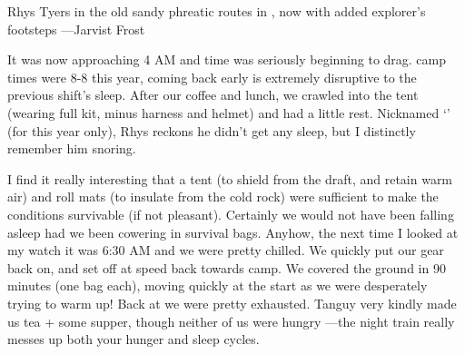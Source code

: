 \begin{marginfigure}
\checkoddpage \ifoddpage \forcerectofloat \else \forceversofloat \fi
\centering
 \caption{Rhys Tyers in the old sandy phreatic routes in , now with added explorer's footsteps ---Jarvist Frost}
 \label{potato formations}
\end{marginfigure}

It was now approaching 4 AM and time was seriously beginning to drag.  camp times were 8-8 this year, coming back early is extremely disruptive to the previous shift's sleep. After our coffee and lunch, we crawled into the tent (wearing full kit, minus harness and helmet) and had a little rest. Nicknamed `' (for this year only), Rhys reckons he didn't get any sleep, but I distinctly remember him snoring.

I find it really interesting that a tent (to shield from the draft, and retain warm air) and roll mats (to insulate from the cold rock) were sufficient to make the conditions survivable (if not pleasant). Certainly we would not have been falling asleep had we been cowering in survival bags.
Anyhow, the next time I looked at my watch it was 6:30 AM and we were pretty chilled. We quickly put our gear back on, and set off at speed back towards camp. We covered the ground in 90 minutes (one bag each), moving quickly at the start as we were desperately trying to warm up!
Back at  we were pretty exhausted. Tanguy very kindly made us tea + some supper, though neither of us were hungry ---the night train really messes up both your hunger and sleep cycles.

